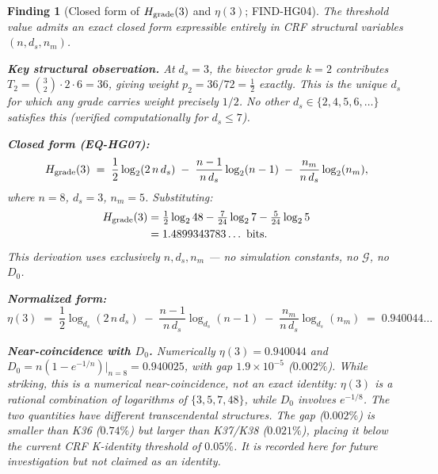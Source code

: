 \documentclass[12pt, a4paper]{article}
\newtheorem{finding}{Finding}[section]
\begin{document}
\begin{finding}[Closed form of $H_{\rm grade}(3)$ and $\eta(3)$;
  FIND-HG04]
\label{find:closedform}
The threshold value admits an exact closed form expressible entirely
in CRF structural variables $(n, d_s, n_m)$.

\textbf{Key structural observation.} At $d_s = 3$, the bivector
grade $k=2$ contributes $T_2 = \binom{3}{2}\cdot 2\cdot 6 = 36$,
giving weight $p_2 = 36/72 = \tfrac{1}{2}$ \emph{exactly}. This is
the unique $d_s$ for which any grade carries weight precisely $1/2$.
No other $d_s \in \{2, 4, 5, 6, \ldots\}$ satisfies this
(verified computationally for $d_s \leq 7$).

\textbf{Closed form (EQ-HG07):}
\begin{equation}
  H_{\rm grade}(3)
  \;=\;
  \frac{1}{2}\log_2(2\,n\,d_s)
  \;-\; \frac{n-1}{n\,d_s}\log_2(n-1)
  \;-\; \frac{n_m}{n\,d_s}\log_2(n_m),
  \label{eq:Hgrade-closed}
\end{equation}
where $n = 8$, $d_s = 3$, $n_m = 5$. Substituting:
\begin{align*}
  H_{\rm grade}(3)
  &= \tfrac{1}{2}\log_2 48
     - \tfrac{7}{24}\log_2 7
     - \tfrac{5}{24}\log_2 5 \\
  &= 1.4899343783\ldots \text{ bits}.
\end{align*}
This derivation uses exclusively $n, d_s, n_m$ --- no simulation
constants, no $\mathcal{G}$, no $D_0$.

\textbf{Normalized form:}
\begin{equation}
  \eta(3)
  \;=\;
  \frac{1}{2}\log_{d_s}(2\,n\,d_s)
  \;-\; \frac{n-1}{n\,d_s}\log_{d_s}(n-1)
  \;-\; \frac{n_m}{n\,d_s}\log_{d_s}(n_m)
  \;=\; 0.940044\ldots
  \label{eq:eta-closed}
\end{equation}

\textbf{Near-coincidence with $D_0$.}
Numerically $\eta(3) = 0.940044$ and $D_0 = n(1-e^{-1/n})|_{n=8}
= 0.940025$, with gap $1.9\times 10^{-5}$ ($0.002\%$). While
striking, this is a \emph{numerical near-coincidence}, not an exact
identity: $\eta(3)$ is a rational combination of logarithms of
$\{3, 5, 7, 48\}$, while $D_0$ involves $e^{-1/8}$. The two
quantities have different transcendental structures. The gap
($0.002\%$) is smaller than K36 ($0.74\%$) but larger than
K37/K38 ($0.021\%$), placing it below the current CRF
K-identity threshold of $0.05\%$. It is recorded here for
future investigation but not claimed as an identity.
\end{finding}
\end{document}
